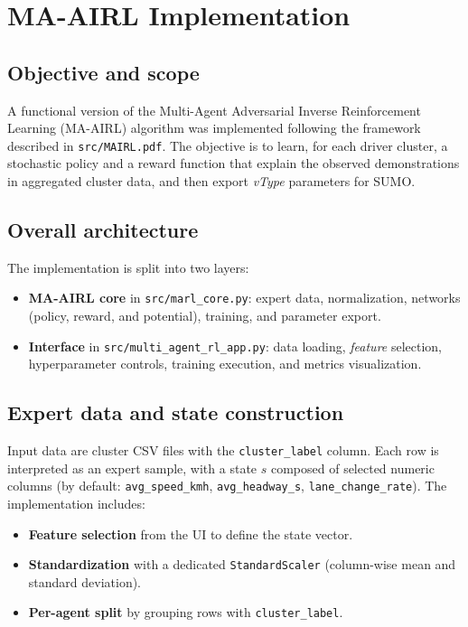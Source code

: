 \section{MA-AIRL Implementation}

\subsection{Objective and scope}
A functional version of the Multi-Agent Adversarial Inverse Reinforcement Learning (MA-AIRL) algorithm was implemented following the framework described in \texttt{src/MAIRL.pdf}. The objective is to learn, for each driver cluster, a stochastic policy and a reward function that explain the observed demonstrations in aggregated cluster data, and then export \textit{vType} parameters for SUMO.

\subsection{Overall architecture}
The implementation is split into two layers:
\begin{itemize}
\item \textbf{MA-AIRL core} in \texttt{src/marl\_core.py}: expert data, normalization, networks (policy, reward, and potential), training, and parameter export.
\item \textbf{Interface} in \texttt{src/multi\_agent\_rl\_app.py}: data loading, \textit{feature} selection, hyperparameter controls, training execution, and metrics visualization.
\end{itemize}

\subsection{Expert data and state construction}
Input data are cluster CSV files with the \texttt{cluster\_label} column. Each row is interpreted as an expert sample, with a state $s$ composed of selected numeric columns (by default: \texttt{avg\_speed\_kmh}, \texttt{avg\_headway\_s}, \texttt{lane\_change\_rate}). The implementation includes:
\begin{itemize}
\item \textbf{Feature selection} from the UI to define the state vector.
\item \textbf{Standardization} with a dedicated \texttt{StandardScaler} (column-wise mean and standard deviation).
\item \textbf{Per-agent split} by grouping rows with \texttt{cluster\_label}.
\end{itemize}

